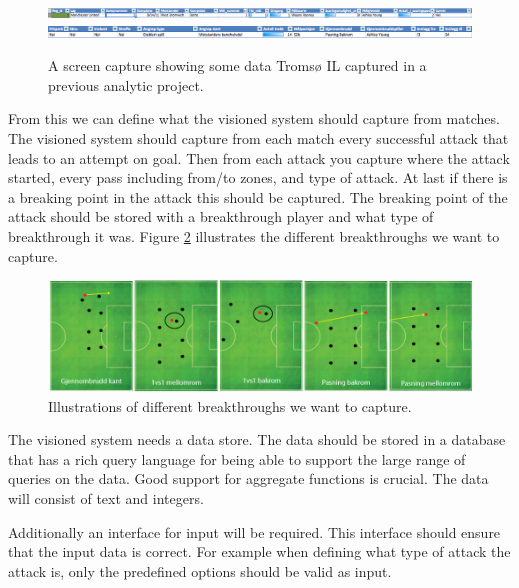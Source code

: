 \begin{figure}[ht!]
\centering
\includegraphics[width=1\textwidth]{images/general/prev_domain_model2.png}
\includegraphics[width=1\textwidth]{images/general/prev_domain_model1.png}
\caption{A screen capture showing some data Tromsø IL captured in a previous analytic project.}
\label{fig:prevdomainmodel}
\end{figure}

From this we can define what the visioned system should capture from matches. The visioned system should capture from each match every successful attack that leads to an attempt on goal. Then from each attack you capture where the attack started, every pass including from/to zones, and type of attack. At last if there is a breaking point in the attack this should be captured. The breaking point of the attack should be stored with a breakthrough player and what type of breakthrough it was. Figure \ref{fig:different_break} illustrates the different breakthroughs we want to capture.

\begin{figure}[ht!]
\centering
\includegraphics[width=1\textwidth]{images/general/different_breakthroughs.png}
\caption{Illustrations of different breakthroughs we want to capture.}
\label{fig:different_break}
\end{figure}

The visioned system needs a data store. The data should be stored in a database that has a rich query language for being able to support the large range of queries on the data. Good support for aggregate functions is crucial. The data will consist of text and integers.

Additionally an interface for input will be required. This interface should ensure that the input data is correct. For example when defining what type of attack the attack is, only the predefined options should be valid as input. 


